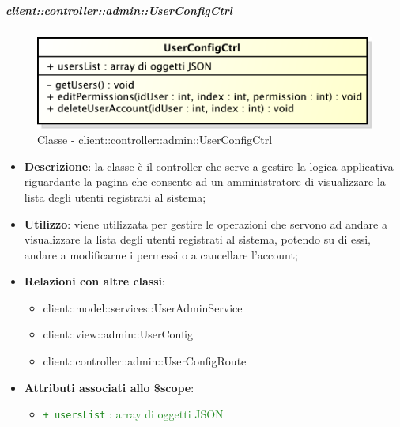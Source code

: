 		\subparagraph{client::controller::admin::UserConfigCtrl} %
		\label{subp:bdsm_app_client_controller_admin_userconfigctrl}
			\begin{figure}[htbp]
				\centering
				\centerline{\includegraphics[scale=0.7]{./images/client/classes/controller/user_config_ctrl.pdf}}
				\caption{Classe - client::controller::admin::UserConfigCtrl}
			\end{figure}
			\begin{itemize}
				\item \textbf{Descrizione}: la classe è il controller che serve a gestire la logica applicativa riguardante la pagina che consente ad un amministratore di visualizzare la lista degli utenti registrati al sistema;
				\item \textbf{Utilizzo}: viene utilizzata per gestire le operazioni che servono ad andare a visualizzare la lista degli utenti registrati al sistema, potendo su di essi, andare a modificarne i permessi o a cancellare l'account;
				\item \textbf{Relazioni con altre classi}:
					\begin{itemize}
						\item client::model::services::UserAdminService
						\item client::view::admin::UserConfig
						\item client::controller::admin::UserConfigRoute
					\end{itemize}

				\item \textbf{Attributi associati allo \$scope}:
					\begin{itemize}
						\item \textcolor{forestgreen}{\texttt{+ usersList} : array di oggetti JSON}


\end{itemize}
\end{itemize}
